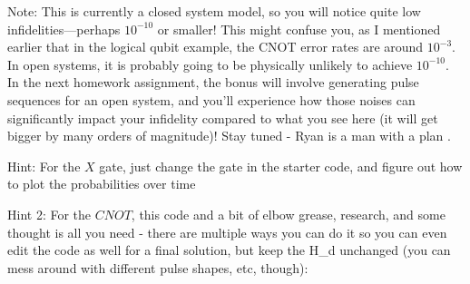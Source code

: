 \documentclass[12pt]{article}
\begin{document}
Note: This is currently a closed system model, so you will notice quite low infidelities—perhaps $10^{-10}$ or smaller! This might confuse you, as I mentioned earlier that in the logical qubit example, the CNOT error rates are around $10^{-3}$. In open systems, it is probably going to be physically unlikely to achieve $10^{-10}$. In the next homework assignment, the bonus will involve generating pulse sequences for an open system, and you'll experience how those noises can significantly impact your infidelity compared to what you see here (it will get bigger by many orders of magnitude)! Stay tuned - Ryan is a man with a plan \smiley{}.

Hint: For the $X$ gate, just change the gate in the starter code, and figure out how to plot the probabilities over time \smiley{}

Hint 2: For the $CNOT$, this code and a bit of elbow grease, research, and some thought is all you need - there are multiple ways you can do it so you can even edit the code as well for a final solution, but keep the H\_d unchanged (you can mess around with different pulse shapes, etc, though):
\end{document}
